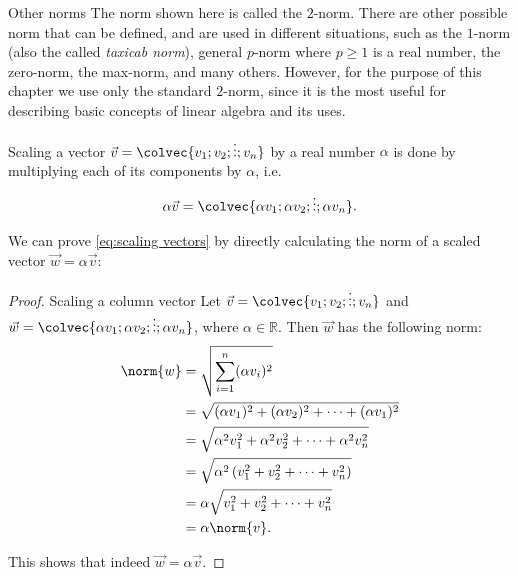 \begin{note}{Other norms}{}
	The norm shown here is called the $2$-norm. There are other possible norm that can be defined, and are used in different situations, such as the $1$-norm (also the called \emph{taxicab norm}), general $p$-norm where $p\geq1$ is a real number, the zero-norm, the max-norm, and many others. However, for the purpose of this chapter we use only the standard $2$-norm, since it is the most useful for describing basic concepts of linear algebra and its uses.
\end{note}

Scaling a vector $\vec{v}=\colvec{v_{1};v_{2};\vdots;v_{n}}$ by a real number $\alpha$ is done by multiplying each of its components by $\alpha$, i.e.
\begin{equation}
	\alpha\vec{v} = \colvec{\alpha v_{1};\alpha v_{2};\vdots;\alpha v_{n}}.
	\label{eq:scaling vectors}
\end{equation}

We can prove \autoref{eq:scaling vectors} by directly calculating the norm of a scaled vector $\vec{w}=\alpha\vec{v}$:
\begin{proof}{Scaling a column vector}{}
	Let $\vec{v}=\colvec{v_{1};v_{2};\vdots;v_{n}}$ and $\vec{w}=\colvec{\alpha v_{1};\alpha v_{2};\vdots;\alpha v_{n}}$, where $\alpha\in\mathbb{R}$. Then $\vec{w}$ has the following norm:
	\begin{align*}
		\norm{w} &= \sqrt{\sum\limits_{i=1}^{n}(\alpha v_{i})^{2}}\\
		&= \sqrt{(\alpha v_{1})^{2} + (\alpha v_{2})^{2} + \dots + (\alpha v_{1})^{2}}\\
		&= \sqrt{\alpha^{2}v_{1}^{2} + \alpha^{2}v_{2}^{2} + \dots + \alpha^{2}v_{n}^{2}}\\
		&= \sqrt{\alpha^{2}\left( v_{1}^{2} + v_{2}^{2} + \dots + v_{n}^{2} \right)}\\
		&= \alpha\sqrt{v_{1}^{2} + v_{2}^{2} + \dots + v_{n}^{2}}\\
		&= \alpha\norm{v}.
	\end{align*}

	This shows that indeed $\vec{w}=\alpha\vec{v}$.
\end{proof}


